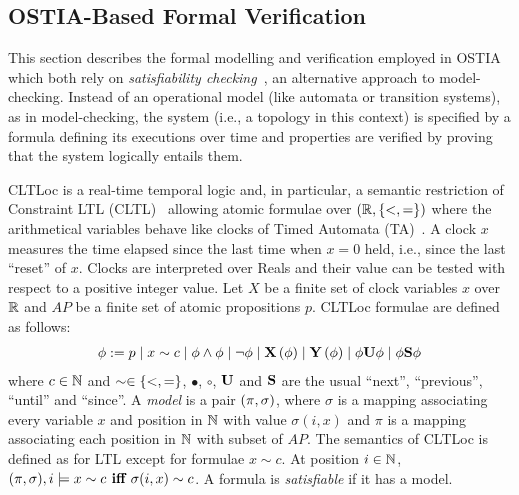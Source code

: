 \subsection{OSTIA-Based Formal Verification}\label{ver}


This section describes the formal modelling and verification employed in OSTIA  which both rely on \textit{satisfiability checking}~\cite{MPS13}, an alternative approach to model-checking.
Instead of an operational model (like automata or transition systems), as in model-checking, 
the system (i.e., a topology in this context) is specified by a formula defining its executions over time and properties are verified by proving that the system logically entails them.

CLTLoc is a real-time temporal logic and, in particular, a semantic restriction of Constraint LTL (CLTL)~\cite{DD07} allowing atomic formulae over $(\mathbb{R}, \{ <,= \})$ where the arithmetical variables behave like clocks of Timed Automata (TA)~\cite{timed}.
A clock $x$ measures the time elapsed since the last time when $x=0$ held, i.e., since the last ``reset'' of $x$.
Clocks are interpreted over Reals and their value can be tested with respect to a positive integer value.
%
Let $X$ be a finite set of clock variables $x$ over $\mathbb{R}$ and $AP$ be a finite set of atomic propositions $p$.
CLTLoc formulae are defined as follows:
\begin{equation*}%
  \phi :=
  \begin{gathered}
    p \mid x\sim c \mid \phi \wedge \phi \mid \neg \phi \mid
   \X{\phi} \mid \Y{\phi} %
\mid \phi\U\phi \mid \phi\Snc\phi
  \end{gathered}
\end{equation*}
where %
$c \in \mathbb{N}$ and $\sim \in \{ <,= \}$, $\bullet$, $\circ$, $\mathbf{U}$ and $\mathbf{S}$ are the usual ``next'', ``previous'', ``until'' and ``since''.
A \textit{model} is a pair $(\pi, \sigma)$, where $\sigma$ is a mapping associating every variable $x$ and position in $\mathbb{N}$ with value $\sigma(i,x)$ and $\pi$ is a mapping associating each position in $\mathbb{N}$ with subset of $AP$. 
The semantics of CLTLoc is defined as for LTL except for formulae $x\sim c$. 
At position $i\in\mathbb{N}$, $ (\pi, \sigma), i \models x\sim c \textbf{ iff }  \sigma(i, x)\sim c$.
A formula is \textit{satisfiable} if it has a model.

